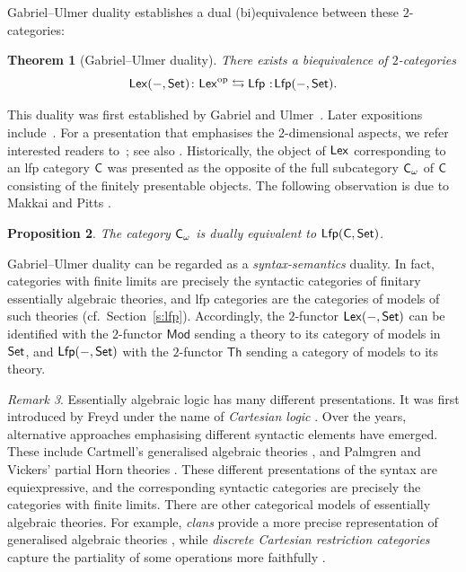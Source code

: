 \documentclass[a4paper,10pt,reqno]{amsart}
\newtheorem{theorem}{Theorem}[section]
\newtheorem{proposition}[theorem]{Proposition}
\theoremstyle{definition}
\theoremstyle{remark}
\newtheorem{remark}[theorem]{Remark}
\newcommand{\cat}{{\sf C}}								%
\newcommand{\Set}{{\sf Set}}								%
\newcommand{\fp}[1]{{#1}_{\omega}}						%
\newcommand{\Lfp}{{\sf Lfp}}								%
\newcommand{\Lex}{{\sf Lex}}								%
\newcommand{\op}{{\mathrm{op}}}						%
\newcommand*\cocolon{%
        \nobreak
        \mskip6mu plus1mu
        \mathpunct{}%
        \nonscript
        \mkern-\thinmuskip
        {:}%
        \mskip2mu
        \relax
}
\begin{document}
Gabriel--Ulmer duality establishes a dual (bi)equivalence between these $2$-categories:

\begin{theorem}[Gabriel--Ulmer duality]\label{t:GU-duality}
There exists a biequivalence of $2$-categories  
\[\Lex(-,\Set)\colon \Lex^{\op} \leftrightarrows \Lfp \cocolon\Lfp(-,\Set).\]
\end{theorem}

This duality was first established by Gabriel and Ulmer~\cite{GabrielUlmer1971}. Later expositions include~\cite{ar94book}. For a presentation that emphasises the $2$-dimensional aspects, we refer interested readers to~\cite{MakkaiPitts1987,AP1998}; see also \cite{LackPower2009, Tendas2025}.
%
Historically, the object of $\Lex$ corresponding to an lfp category $\cat$ was presented as the opposite of the full subcategory $\fp{\cat}$ of $\cat$ consisting of the finitely presentable objects. The following observation is due to Makkai and Pitts \cite[Corollary~1.5]{MakkaiPitts1987}.

\begin{proposition}\label{prop:twofaces}
The category $\fp{\cat}$ is dually equivalent to $\Lfp(\cat,\Set)$.
\end{proposition}

Gabriel--Ulmer duality can be regarded as a \emph{syntax-semantics} duality. In fact, categories with finite limits are precisely the syntactic categories of finitary essentially algebraic theories, and lfp categories are the categories of models of such theories (cf.\ Section~\ref{s:lfp}). Accordingly, the $2$-functor $\Lex(-,\Set)$ can be identified with the $2$-functor $\mathsf{Mod}$ sending a theory to its category of models in $\Set$, and $\Lfp(-,\Set)$ with the $2$-functor $\mathsf{Th}$ sending a category of models to its theory.


\begin{remark}
Essentially algebraic logic has many different presentations. It was first introduced by Freyd under the name of \emph{Cartesian logic} \cite{Freyd1972AspectsOfTopoi,Freyd2002CartesianLogic}. Over the years, alternative approaches emphasising different syntactic elements have emerged. These include Cartmell's generalised algebraic theories \cite{Cartmell1986GeneralisedAlgebraicTheories}, and Palmgren and Vickers' partial Horn theories \cite{PalmgrenVickers2007PartialHorn}. 
These different presentations of the syntax are equiexpressive, and the corresponding syntactic categories are precisely the categories with finite limits. There are other categorical models of essentially algebraic theories. For example, \emph{clans} provide a more precise representation of generalised algebraic theories \cite{Frey2025DualityClans,ALN25}, while \emph{discrete Cartesian restriction categories} capture the partiality of some operations more faithfully \cite{DiLibertiEtAl2021PartialTheories}. 
\end{remark}
\end{document}
